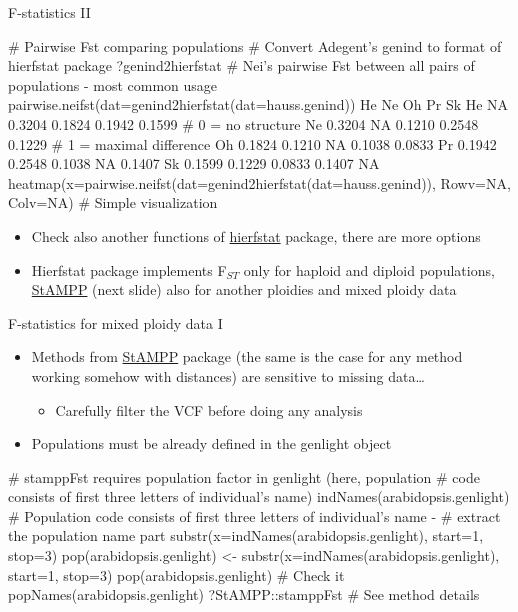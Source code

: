 \documentclass[compress, xelatex, 11pt, xcolor=svgnames, aspectratio=169,
	hyperref={
		bookmarks=true,
		unicode=true,
		colorlinks=true,
		pdftitle={Molecular data in R},
		plainpages=false,
		pdfauthor={Vojtech Zeisek},
		pdfsubject={Course about phylogeny and evolution in R},
		pdfcreator={XeLaTeX},
		pdfkeywords={R, evolution, phylogeny, molecular data},
		linkcolor=Crimson, %
		anchorcolor=Magenta, %
		citecolor=Magenta, %
		filecolor=Magenta, %
		menucolor=Magenta, %
		urlcolor=DodgerBlue, %
		},
	url={hyphens, lowtilde} %
	]{beamer}
\begin{document}
\begin{frame}[fragile]{F-statistics II}
	\begin{spluscode}
    # Pairwise Fst comparing populations
    # Convert Adegent's genind to format of hierfstat package
    ?genind2hierfstat
    # Nei's pairwise Fst between all pairs of populations - most common usage
    pairwise.neifst(dat=genind2hierfstat(dat=hauss.genind))
           He     Ne     Oh     Pr     Sk
    He     NA 0.3204 0.1824 0.1942 0.1599 # 0 = no structure
    Ne 0.3204     NA 0.1210 0.2548 0.1229 # 1 = maximal difference
    Oh 0.1824 0.1210     NA 0.1038 0.0833
    Pr 0.1942 0.2548 0.1038     NA 0.1407
    Sk 0.1599 0.1229 0.0833 0.1407     NA
    heatmap(x=pairwise.neifst(dat=genind2hierfstat(dat=hauss.genind)),
      Rowv=NA, Colv=NA) # Simple visualization
	\end{spluscode}
	\begin{itemize}
		\item Check also another functions of \href{https://CRAN.R-project.org/package=hierfstat}{hierfstat} package, there are more options
		\item Hierfstat package implements F$_{ST}$ only for haploid and diploid populations, \href{https://CRAN.R-project.org/package=StAMPP}{StAMPP} (next slide) also for another ploidies and mixed ploidy data
	\end{itemize}
\end{frame}

\begin{frame}[fragile]{F-statistics for mixed ploidy data I}
	\begin{itemize}
		\item Methods from \href{https://CRAN.R-project.org/package=StAMPP}{StAMPP} package (the same is the case for any method working somehow with distances) are sensitive to missing data\ldots
		\begin{itemize}
			\item Carefully filter the VCF before doing any analysis
		\end{itemize}
		\item Populations must be already defined in the genlight object
	\end{itemize}
	\begin{spluscode}
    # stamppFst requires population factor in genlight (here, population
    # code consists of first three letters of individual's name)
    indNames(arabidopsis.genlight)
    # Population code consists of first three letters of individual's name -
    # extract the population name part
    substr(x=indNames(arabidopsis.genlight), start=1, stop=3)
    pop(arabidopsis.genlight) <- substr(x=indNames(arabidopsis.genlight),
      start=1, stop=3)
    pop(arabidopsis.genlight) # Check it
    popNames(arabidopsis.genlight)
    ?StAMPP::stamppFst # See method details
	\end{spluscode}
\end{frame}
\end{document}

